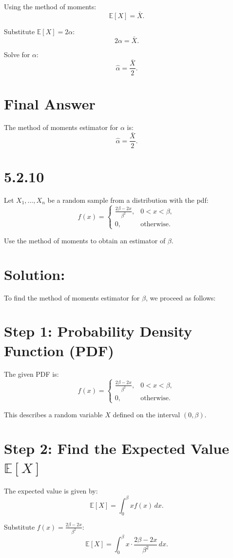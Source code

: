 \documentclass{article}
\begin{document}
Using the method of moments:
\[
\mathbb{E}[X] = \bar{X}.
\]

Substitute $\mathbb{E}[X] = 2\alpha$:
\[
2\alpha = \bar{X}.
\]

Solve for $\alpha$:
\[
\hat{\alpha} = \frac{\bar{X}}{2}.
\]

\section*{Final Answer}
The method of moments estimator for $\alpha$ is:
\[
\hat{\alpha} = \frac{\bar{X}}{2}.
\]

\section*{5.2.10}

Let $X_1, \dots, X_n$ be a random sample from a distribution with the pdf:
\[
f(x) =
\begin{cases}
\frac{2\beta - 2x}{\beta^2}, & 0 < x < \beta, \\
0, & \text{otherwise}.
\end{cases}
\]

Use the method of moments to obtain an estimator of $\beta$.

\section*{Solution:}

To find the method of moments estimator for $\beta$, we proceed as follows:

\section*{Step 1: Probability Density Function (PDF)}
The given PDF is:
\[
f(x) =
\begin{cases}
\frac{2\beta - 2x}{\beta^2}, & 0 < x < \beta, \\
0, & \text{otherwise}.
\end{cases}
\]

This describes a random variable $X$ defined on the interval $(0, \beta)$.

\section*{Step 2: Find the Expected Value $\mathbb{E}[X]$}
The expected value is given by:
\[
\mathbb{E}[X] = \int_0^\beta x f(x) \, dx.
\]

Substitute $f(x) = \frac{2\beta - 2x}{\beta^2}$:
\[
\mathbb{E}[X] = \int_0^\beta x \cdot \frac{2\beta - 2x}{\beta^2} \, dx.
\]
\end{document}

